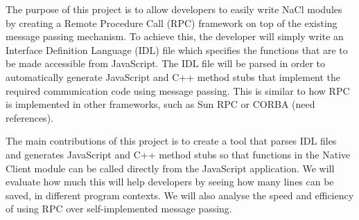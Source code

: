 The purpose of this project is to allow developers to easily write NaCl modules by creating a Remote Procedure Call (RPC) framework on top of the existing message passing mechanism. To achieve this, the developer will simply write an Interface Definition Language (IDL) file which specifies the functions that are to be made accessible from JavaScript. The IDL file will be parsed in order to automatically generate JavaScript and C++ method stubs that implement the required communication code using message passing. This is similar to how RPC is implemented in other frameworks, such as Sun RPC or CORBA (need references).

The main contributions of this project is to create a tool that parses IDL files and generates JavaScript and C++ method stubs so that functions in the Native Client module can be called directly from the JavaScript application. We will evaluate how much this will help developers by seeing how many lines can be saved, in different program contexts. We will also analyse the speed and efficiency of using RPC over self-implemented message passing. 
